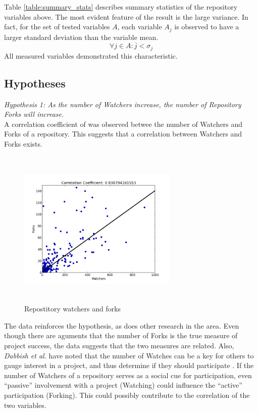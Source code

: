 \documentclass{proc}
\begin{document}
Table \ref{table:summary_stats} describes summary statistics of the repository variables above. The most evident feature of the result is the large variance. In fact, for the set of tested variables $A$, each variable $A_j$ is observed to have a larger standard deviation than the variable mean.
\begin{equation}
\forall j \in A \colon \overline{j} < \sigma_{j}
\label{eq:variance}
\end{equation}
All measured variables demonstrated this characteristic.

\subsection{Hypotheses}
\emph{Hypothesis 1: As the number of Watchers increase, the number of Repository Forks will increase.}\\
A correlation coefficient of  was observed betwee the number of Watchers and Forks of a repository. This suggests that a correlation between Watchers and Forks exists.
\begin{figure}
\includegraphics[height=3in,width=3in]{images/watcher_forks_scatterplot.png}
\caption{Repostitory watchers and forks}
\end{figure}
The data reinforces the hypothesis, as does other research in the area. Even though there are aguments that the number of Forks is the true measure of project success\cite{baudry2012towards}, the data suggests that the two measures are related. Also, \textit{Dabbish et al.} have noted that the number of Watches can be a key for others to gauge interest in a project, and thus determine if they should participate \cite{dabbish2013leveraging}. If the number of Watchers of a repository serves as a social cue for participation, even ``passive'' involvement with a project (Watching) could influence the ``active'' participation (Forking). This could possibly contribute to the correlation of the two variables.
\end{document}
